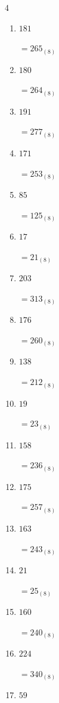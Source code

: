 \begin{multicols}{4}
\begin{enumerate}
  \item $181$

        $=265_{(8)}$

  \item $180$

        $=264_{(8)}$

  \item $191$

        $=277_{(8)}$

  \item $171$

        $=253_{(8)}$

  \item $85$

        $=125_{(8)}$

  \item $17$

        $=21_{(8)}$

  \item $203$

        $=313_{(8)}$

  \item $176$

        $=260_{(8)}$

  \item $138$

        $=212_{(8)}$

  \item $19$

        $=23_{(8)}$

  \item $158$

        $=236_{(8)}$

  \item $175$

        $=257_{(8)}$

  \item $163$

        $=243_{(8)}$

  \item $21$

        $=25_{(8)}$

  \item $160$

        $=240_{(8)}$

\columnbreak %

  \item $224$

        $=340_{(8)}$

  \item $59$


\end{enumerate}
\end{multicols}
